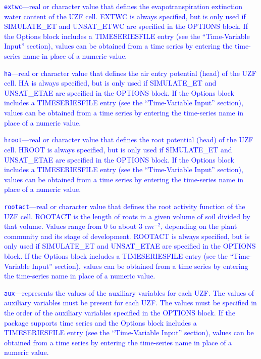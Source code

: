 \begin{description}
\item \textcolor{blue}{\texttt{extwc}---real or character value that defines the evapotranspiration extinction water content of the UZF cell. EXTWC is always specified, but is only used if SIMULATE\_ET and UNSAT\_ETWC are specified in the OPTIONS block. If the Options block includes a TIMESERIESFILE entry (see the ``Time-Variable Input'' section), values can be obtained from a time series by entering the time-series name in place of a numeric value.}

\item \textcolor{blue}{\texttt{ha}---real or character value that defines the air entry potential (head) of the UZF cell. HA is always specified, but is only used if SIMULATE\_ET and UNSAT\_ETAE are specified in the OPTIONS block. If the Options block includes a TIMESERIESFILE entry (see the ``Time-Variable Input'' section), values can be obtained from a time series by entering the time-series name in place of a numeric value.}

\item \textcolor{blue}{\texttt{hroot}---real or character value that defines the root potential (head) of the UZF cell. HROOT is always specified, but is only used if SIMULATE\_ET and UNSAT\_ETAE are specified in the OPTIONS block. If the Options block includes a TIMESERIESFILE entry (see the ``Time-Variable Input'' section), values can be obtained from a time series by entering the time-series name in place of a numeric value.}

\item \textcolor{blue}{\texttt{rootact}---real or character value that defines the root activity function of the UZF cell. ROOTACT is the length of roots in a given volume of soil divided by that volume. Values range from 0 to about 3 $cm^{-2}$, depending on the plant community and its stage of development. ROOTACT is always specified, but is only used if SIMULATE\_ET and UNSAT\_ETAE are specified in the OPTIONS block. If the Options block includes a TIMESERIESFILE entry (see the ``Time-Variable Input'' section), values can be obtained from a time series by entering the time-series name in place of a numeric value.}

\item \textcolor{blue}{\texttt{aux}---represents the values of the auxiliary variables for each UZF. The values of auxiliary variables must be present for each UZF. The values must be specified in the order of the auxiliary variables specified in the OPTIONS block.  If the package supports time series and the Options block includes a TIMESERIESFILE entry (see the ``Time-Variable Input'' section), values can be obtained from a time series by entering the time-series name in place of a numeric value.}

\end{description}

